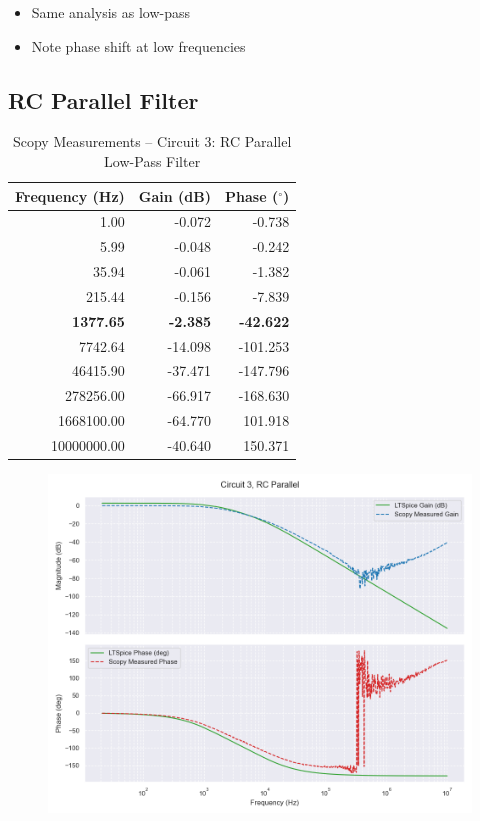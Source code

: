 \documentclass[12pt]{article}
\begin{document}
\begin{itemize}
	\item Same analysis as low-pass
	\item Note phase shift at low frequencies
\end{itemize}

\subsection{RC Parallel Filter}

\begin{table}[H]
	\centering
	\caption{Scopy Measurements – Circuit 3: RC Parallel Low-Pass Filter}
	\begin{tabular}{|r|r|r|}
		\hline
		\textbf{Frequency (Hz)} & \textbf{Gain (dB)} & \textbf{Phase ($^\circ$)} \\
		\hline
		1.00                    & -0.072             & -0.738                    \\
		5.99                    & -0.048             & -0.242                    \\
		35.94                   & -0.061             & -1.382                    \\
		215.44                  & -0.156             & -7.839                    \\
		\textbf{1377.65}        & \textbf{-2.385}    & \textbf{-42.622}          \\
		7742.64                 & -14.098            & -101.253                  \\
		46415.90                & -37.471            & -147.796                  \\
		278256.00               & -66.917            & -168.630                  \\
		1668100.00              & -64.770            & 101.918                   \\
		10000000.00             & -40.640            & 150.371                   \\
		\hline
	\end{tabular}
\end{table}
\begin{figure}[H]
	\includegraphics[width=\textwidth]{e6_bode3}
\end{figure}
\end{document}
